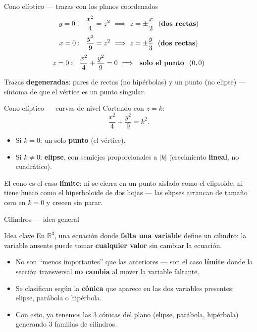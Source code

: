 \documentclass[11pt,aspectratio=169]{beamer}
\begin{document}
\begin{frame}{Cono elíptico --- trazas con los planos coordenados}
  \[
    y=0:\ \ \frac{x^2}{4}=z^2 \ \Longrightarrow\ z=\pm\frac{x}{2}\ \ \text{(\textbf{dos rectas})}
  \]
  \pause
  \[
    x=0:\ \ \frac{y^2}{9}=z^2 \ \Longrightarrow\ z=\pm\frac{y}{3}\ \ \text{(\textbf{dos rectas})}
  \]
  \pause
  \[
    z=0:\ \ \frac{x^2}{4}+\frac{y^2}{9}=0 \ \Longrightarrow\ \ \text{\textbf{solo el punto } }(0,0)
  \]
  \pause
  \begin{center}\normalsize\color{tealx}
  Trazas \textbf{degeneradas}: pares de rectas (no hipérbolas) y un punto (no elipse) --- síntoma de que el vértice es un punto singular.
  \end{center}
\end{frame}

\begin{frame}{Cono elíptico --- curvas de nivel}
  Cortando con $z=k$:
  \[
    \frac{x^2}{4}+\frac{y^2}{9}=k^2.
  \]
  \pause
  \begin{itemize}
    \item Si $k=0$: un solo \textbf{punto} (el vértice).
    \pause
    \item Si $k\neq0$: \textbf{elipse}, con semiejes proporcionales a $|k|$ (crecimiento \textbf{lineal}, no cuadrático).
  \end{itemize}
  \pause
  \begin{center}\normalsize\color{tealx}
  El cono es el caso \textbf{límite}: ni se cierra en un punto aislado como el elipsoide, ni tiene hueco como el hiperboloide de dos hojas --- las elipses arrancan de tamaño cero en $k=0$ y crecen sin parar.
  \end{center}
\end{frame}


\begin{frame}{Cilindros --- idea general}
  \begin{block}{Idea clave}
    En $\mathbb{R}^3$, una ecuación donde \textbf{falta una variable} define un cilindro: la variable ausente puede tomar \textbf{cualquier valor} sin cambiar la ecuación.
  \end{block}
  \pause
  \begin{itemize}
    \item No son ``menos importantes'' que las anteriores --- son el caso \textbf{límite} donde la sección transversal \textbf{no cambia} al mover la variable faltante.
    \pause
    \item Se clasifican según la \textbf{cónica} que aparece en las dos variables presentes: elipse, parábola o hipérbola.
    \pause
    \item Con esto, ya tenemos las 3 cónicas del plano (elipse, parábola, hipérbola) generando 3 familias de cilindros.
  \end{itemize}
\end{frame}
\end{document}
